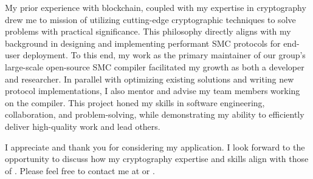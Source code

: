 My prior experience with blockchain, coupled with my expertise in cryptography drew me to \companys mission of 
utilizing cutting-edge cryptographic techniques to solve problems with practical significance.
This philosophy directly aligns with my background in designing and implementing performant SMC protocols for end-user deployment.
To this end, my work as the primary maintainer of our group's large-scale open-source SMC compiler facilitated my growth as both a developer and researcher.
In parallel with optimizing existing solutions and writing new protocol implementations, I also mentor and advise my team members working on the compiler.
This project honed my skills in software engineering, collaboration, and problem-solving, while demonstrating my ability to efficiently deliver high-quality work and lead others.



I appreciate and thank you for considering my application. 
I look forward to the opportunity to discuss how my cryptography expertise and skills align with those of \company.
Please feel free to contact me at \myphone or \myemail. 


